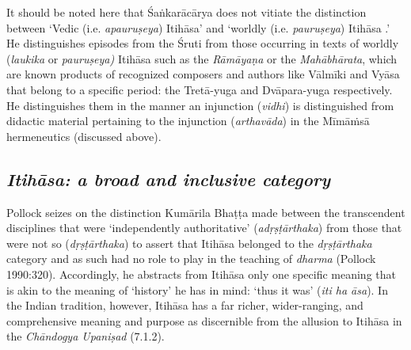 It should be noted here that Śaṅkarācārya does not vitiate the distinction between ‘Vedic (i.e. \textit{apauruṣeya}) Itihāsa’ and ‘worldly (i.e. \textit{pauruṣeya}) Itihāsa .’ He distinguishes episodes from the Śruti from those occurring in texts of worldly (\textit{laukika} or \textit{pauruṣeya)} Itihāsa such as the \textit{Rāmāyaṇa} or the \textit{Mahābhārata}, which are known products of recognized composers and authors like Vālmīki and Vyāsa that belong to a specific period: the Tretā-yuga and Dvāpara-yuga respectively. He distinguishes them in the manner an injunction (\textit{vidhi}) is distinguished from didactic material pertaining to the injunction (\textit{arthavāda}) in the Mīmāṁsā hermeneutics (discussed above).

\subsection*{\textit{Itihāsa: a broad and inclusive category}}

Pollock seizes on the distinction Kumārila Bhaṭṭa made between the transcendent disciplines that were ‘independently authoritative’ (\textit{adṛṣṭārthaka}) from those that were not so (\textit{dṛṣṭārthaka}) to assert that Itihāsa belonged to the \textit{dṛṣṭārthaka} category and as such had no role to play in the teaching of \textit{dharma} (Pollock 1990:320). Accordingly, he abstracts from Itihāsa only one specific meaning that is akin to the meaning of ‘history’ he has in mind: ‘thus it was’ (\textit{iti ha āsa}). In the Indian tradition, however, Itihāsa has a far richer, wider-ranging, and comprehensive meaning and purpose as discernible from the allusion to Itihāsa in the \textit{Chāndogya Upaniṣad} (7.1.2). 

